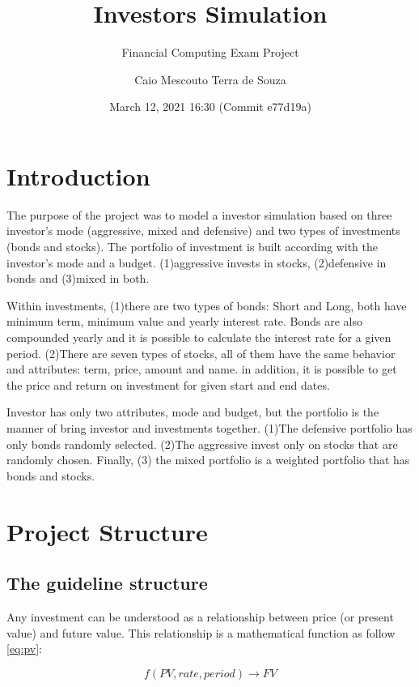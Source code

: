 \documentclass[
  11pt,
]{article}
\title{Investors Simulation}
\subtitle{Financial Computing Exam Project}
\author{Caio Mescouto Terra de Souza}
\date{March 12, 2021 16:30 (Commit e77d19a)}
\begin{document}
\maketitle

\hypertarget{introduction}{%
\section{Introduction}\label{introduction}}

The purpose of the project was to model a investor simulation based on three investor's mode (aggressive, mixed and defensive) and two types of investments (bonds and stocks). The portfolio of investment is built according with the investor's mode and a budget. (1)aggressive invests in stocks, (2)defensive in bonds and (3)mixed in both.

Within investments, (1)there are two types of bonds: Short and Long, both have minimum term, minimum value and yearly interest rate. Bonds are also compounded yearly and it is possible to calculate the interest rate for a given period. (2)There are seven types of stocks, all of them have the same behavior and attributes: term, price, amount and name. in addition, it is possible to get the price and return on investment for given start and end dates.

Investor has only two attributes, mode and budget, but the portfolio is the manner of bring investor and investments together. (1)The defensive portfolio has only bonds randomly selected. (2)The aggressive invest only on stocks that are randomly chosen. Finally, (3) the mixed portfolio is a weighted portfolio that has bonds and stocks.

\hypertarget{project-structure}{%
\section{Project Structure}\label{project-structure}}

\hypertarget{the-guideline-structure}{%
\subsection{The guideline structure}\label{the-guideline-structure}}

Any investment can be understood as a relationship between price (or present value) and future value. This relationship is a mathematical function as follow \eqref{eq:pv}:

\begin{equation}
f(PV, rate, period)\rightarrow FV
\label{eq:pv}
\end{equation}
\end{document}
